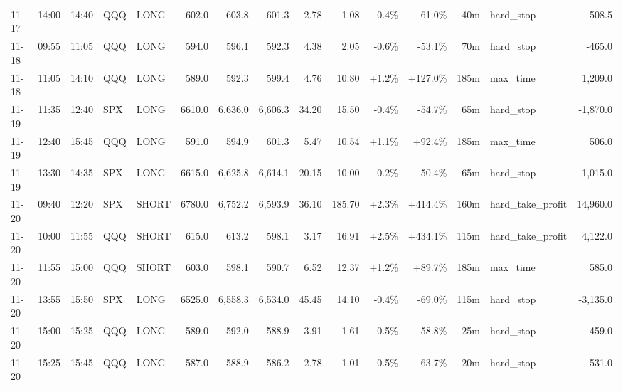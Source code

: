 \documentclass[11pt,a4paper,twoside]{article}
\begin{document}
\begin{landscape}
\begin{center}
\begin{longtable}{>{\color{txtmain}}l l l l l r r r r r r r r >{\color{txtmain}}l r}
11-17 & 14:00 & 14:40 & QQQ & LONG & 602.0 & 603.8 & 601.3 & 2.78 & 1.08 & \textcolor{lossred}{-0.4\%} & \textcolor{lossred}{-61.0\%} & 40m & hard\_stop & \textcolor{lossred}{-508.5} \\
11-18 & 09:55 & 11:05 & QQQ & LONG & 594.0 & 596.1 & 592.3 & 4.38 & 2.05 & \textcolor{lossred}{-0.6\%} & \textcolor{lossred}{-53.1\%} & 70m & hard\_stop & \textcolor{lossred}{-465.0} \\
11-18 & 11:05 & 14:10 & QQQ & LONG & 589.0 & 592.3 & 599.4 & 4.76 & 10.80 & \textcolor{wingreen}{+1.2\%} & \textcolor{wingreen}{+127.0\%} & 185m & max\_time & \textcolor{wingreen}{1,209.0} \\
11-19 & 11:35 & 12:40 & SPX & LONG & 6610.0 & 6,636.0 & 6,606.3 & 34.20 & 15.50 & \textcolor{lossred}{-0.4\%} & \textcolor{lossred}{-54.7\%} & 65m & hard\_stop & \textcolor{lossred}{-1,870.0} \\
11-19 & 12:40 & 15:45 & QQQ & LONG & 591.0 & 594.9 & 601.3 & 5.47 & 10.54 & \textcolor{wingreen}{+1.1\%} & \textcolor{wingreen}{+92.4\%} & 185m & max\_time & \textcolor{wingreen}{506.0} \\
11-19 & 13:30 & 14:35 & SPX & LONG & 6615.0 & 6,625.8 & 6,614.1 & 20.15 & 10.00 & \textcolor{lossred}{-0.2\%} & \textcolor{lossred}{-50.4\%} & 65m & hard\_stop & \textcolor{lossred}{-1,015.0} \\
11-20 & 09:40 & 12:20 & SPX & SHORT & 6780.0 & 6,752.2 & 6,593.9 & 36.10 & 185.70 & \textcolor{wingreen}{+2.3\%} & \textcolor{wingreen}{+414.4\%} & 160m & hard\_take\_profit & \textcolor{wingreen}{14,960.0} \\
11-20 & 10:00 & 11:55 & QQQ & SHORT & 615.0 & 613.2 & 598.1 & 3.17 & 16.91 & \textcolor{wingreen}{+2.5\%} & \textcolor{wingreen}{+434.1\%} & 115m & hard\_take\_profit & \textcolor{wingreen}{4,122.0} \\
11-20 & 11:55 & 15:00 & QQQ & SHORT & 603.0 & 598.1 & 590.7 & 6.52 & 12.37 & \textcolor{wingreen}{+1.2\%} & \textcolor{wingreen}{+89.7\%} & 185m & max\_time & \textcolor{wingreen}{585.0} \\
11-20 & 13:55 & 15:50 & SPX & LONG & 6525.0 & 6,558.3 & 6,534.0 & 45.45 & 14.10 & \textcolor{lossred}{-0.4\%} & \textcolor{lossred}{-69.0\%} & 115m & hard\_stop & \textcolor{lossred}{-3,135.0} \\
11-20 & 15:00 & 15:25 & QQQ & LONG & 589.0 & 592.0 & 588.9 & 3.91 & 1.61 & \textcolor{lossred}{-0.5\%} & \textcolor{lossred}{-58.8\%} & 25m & hard\_stop & \textcolor{lossred}{-459.0} \\
11-20 & 15:25 & 15:45 & QQQ & LONG & 587.0 & 588.9 & 586.2 & 2.78 & 1.01 & \textcolor{lossred}{-0.5\%} & \textcolor{lossred}{-63.7\%} & 20m & hard\_stop & \textcolor{lossred}{-531.0} \\

\end{longtable}
\end{center}
\end{landscape}
\end{document}
